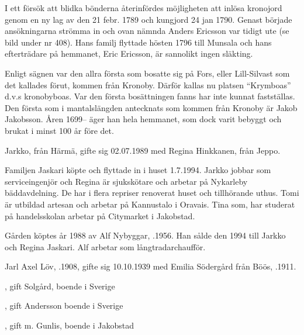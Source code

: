 I ett försök att blidka bönderna återinfördes möjligheten att inlösa kronojord genom en ny lag av den 21 febr. 1789 och kungjord 24 jan 1790. Genast började ansökningarna strömma in och ovan nämnda Anders Ericsson var tidigt ute (se bild under nr 408). Hans familj flyttade hösten 1796 till Munsala och hans efterträdare på hemmanet, Eric Ericsson, är sannolikt ingen släkting.


Enligt sägnen var den allra första som bosatte sig på Fors, eller Lill-Silvast som det kallades förut, kommen från Kronoby. Därför  kallas nu platsen ``Krymboas'' d.v.s kronobyboas. Var den första bosättningen fanns har inte kunnat fastställas. Den första som i mantalslängden antecknats som kommen från Kronoby är Jakob Jakobsson. Åren 1699-- äger han hela hemmanet, som dock varit bebyggt och brukat i minst 100 år före det.



%



%
Jarkko,  från Härmä, gifte sig 02.07.1989 med Regina Hinkkanen,  från Jeppo.
\begin{jhchildren}
  \item {}
  \item {}
\end{jhchildren}

Familjen Jaskari köpte och flyttade in i huset 1.7.1994. Jarkko jobbar som serviceingenjör och Regina är sjukskötare och arbetar på Nykarleby bäddavdelning. De har i flera repriser renoverat huset och tillhörande uthus. Tomi är utbildad artesan och arbetar på Kannustalo i Oravais. Tina som, har studerat på handelsskolan arbetar på Citymarket i Jakobstad.


%
Gården köptes år 1988 av Alf Nybyggar, .1956. Han sålde den 1994 till Jarkko och Regina Jaskari. Alf arbetar som långtradarchaufför.


%
Jarl Axel Löv, .1908, gifte sig 10.10.1939 med Emilia Södergård från Böös, .1911.
\begin{jhchildren}
  \item {}, gift Solgård, boende i Sverige
  \item {}, gift Andersson boende i Sverige
  \item {}, gift m. Gunlis, boende i Jakobstad
\end{jhchildren}

